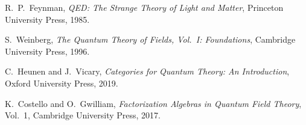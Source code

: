 \documentclass[12pt]{article}
\begin{document}
\vspace{1em}

\begin{thebibliography}{9}

R.\ P.\ Feynman, 
\emph{QED: The Strange Theory of Light and Matter}, 
Princeton University Press, 1985.

S.\ Weinberg, 
\emph{The Quantum Theory of Fields, Vol.\ I: Foundations}, 
Cambridge University Press, 1996.

C.\ Heunen and J.\ Vicary,
\emph{Categories for Quantum Theory: An Introduction},
Oxford University Press, 2019.

K.\ Costello and O.\ Gwilliam,
\emph{Factorization Algebras in Quantum Field Theory}, Vol.\ 1,
Cambridge University Press, 2017.

\end{thebibliography}
\end{document}
